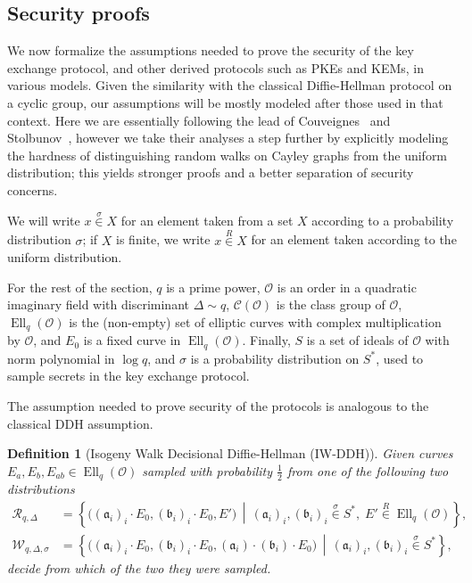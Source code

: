 \documentclass{article}
\newcommand{\Cl}{\mathcal{C}}
\renewcommand{\O}{\mathcal{O}}
\newcommand{\suchthat}{\,\middle\vert\,}
\renewcommand{\frak}{\mathfrak}
\newcommand{\rand}[1]{\overset{#1}{∈}}
\newcommand{\uni}{\rand{R}}
\newtheorem{definition}{Definition}[section]
\theoremstyle{definition}
\DeclareMathOperator{\Ell}{Ell}
\begin{document}
\subsection{Security proofs}
\label{sec:proofs}

We now formalize the assumptions needed to prove the security of the
key exchange protocol, and other derived protocols such as PKEs and
KEMs, in various models. Given the similarity with the classical
Diffie-Hellman protocol on a cyclic group, our assumptions will be
mostly modeled after those used in that context. Here we are
essentially following the lead of
Couveignes~\cite{cryptoeprint:2006:291} and
Stolbunov~\cite{Stol,Stolbunov2012}, however we take their analyses a
step further by explicitly modeling the hardness of distinguishing
random walks on Cayley graphs from the uniform distribution; this
yields stronger proofs and a better separation of security concerns.

We will write $x\rand{σ} X$ for an element taken from a set $X$
according to a probability distribution $σ$; if $X$ is finite, we
write $x\uni X$ for an element taken according to the uniform
distribution.

For the rest of the section, $q$ is a prime power, $\O$ is an order in
a quadratic imaginary field with discriminant $Δ\sim q$, $\Cl(\O)$ is
the class group of $\O$, $\Ell_q(\O)$ is the (non-empty) set of
elliptic curves with complex multiplication by $\O$, and $E_0$ is a
fixed curve in $\Ell_q(\O)$. Finally, $S$ is a set of ideals of $\O$
with norm polynomial in $\log q$, and $σ$ is a probability
distribution on $S^*$, used to sample secrets in the key exchange
protocol.

The assumption needed to prove security of the protocols is analogous
to the classical DDH assumption.

\begin{definition}[Isogeny Walk Decisional Diffie-Hellman (IW-DDH)]
  Given curves $E_a,E_b,E_{ab}∈\Ell_q(\O)$ sampled with probability
  $\frac{1}{2}$ from one of the following two distributions
  \begin{align*}
    \mathcal{R}_{q,Δ} &= \left\{\bigl((\frak a_i)_i·E_0,(\frak b_i)_i·E_0,E'\bigr) \suchthat
                        (\frak a_i)_i,(\frak b_i)_i\rand{σ}S^*,\;
                        E'\uni\Ell_q(\O)\right\},\\
    \mathcal{W}_{q,Δ,σ} &= \left\{\bigl((\frak a_i)_i·E_0,(\frak b_i)_i·E_0,(\frak a_i)·(\frak b_i)·E_0\bigr) \suchthat
                          (\frak a_i)_i,(\frak b_i)_i\rand{σ}S^*\right\},
  \end{align*}
  decide from which of the two they were sampled.
\end{definition}
\end{document}
